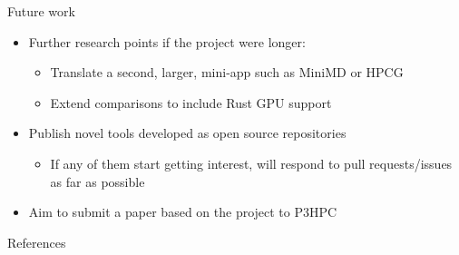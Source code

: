 \documentclass[10pt,aspectratio=169]{beamer}
\begin{document}
\begin{frame}{Future work}
\begin{itemize}
    \item<1-> Further research points if the project were longer:
    \begin{itemize}
        \item Translate a second, larger, mini-app such as MiniMD \cite{} or HPCG \cite{}
        \item Extend comparisons to include Rust GPU support
    \end{itemize}
    \vspace{1cm}
    \item<2-> \alert{Publish novel tools developed} as open source repositories
    \begin{itemize}
        \item<3-> If any of them start getting interest, will respond to pull requests/issues as far as possible
    \end{itemize}
    \item<4-> \alert{Aim to submit a paper} based on the project to P3HPC \cite{}
\end{itemize}
\end{frame}




\appendix

\begin{frame}[allowframebreaks]{References}
  
  
\end{frame}




\end{document}
